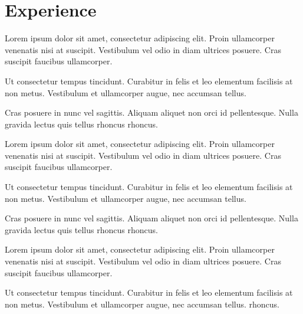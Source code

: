 \documentclass[]{plushcv}
\begin{document}
\begin{minipage}[t]{0.70\textwidth} 



\section{Experience}
\vspace{\topsep} %
\begin{tightemize}
\sectionsep
\item Lorem ipsum dolor sit amet, consectetur adipiscing elit. Proin ullamcorper venenatis nisi at suscipit. Vestibulum vel odio in diam ultrices posuere. Cras suscipit faucibus ullamcorper.
\item Ut consectetur tempus tincidunt. Curabitur in felis et leo elementum facilisis at non metus. Vestibulum et ullamcorper augue, nec accumsan tellus. \item Cras posuere in nunc vel sagittis. Aliquam aliquet non orci id pellentesque. Nulla gravida lectus quis tellus rhoncus rhoncus.  
\end{tightemize}
\sectionsep

\begin{tightemize}
\sectionsep
\item Lorem ipsum dolor sit amet, consectetur adipiscing elit. Proin ullamcorper venenatis nisi at suscipit. Vestibulum vel odio in diam ultrices posuere. Cras suscipit faucibus ullamcorper.
\item Ut consectetur tempus tincidunt. Curabitur in felis et leo elementum facilisis at non metus. Vestibulum et ullamcorper augue, nec accumsan tellus.
\item Cras posuere in nunc vel sagittis. Aliquam aliquet non orci id pellentesque. Nulla gravida lectus quis tellus rhoncus rhoncus.
\end{tightemize}
\sectionsep

\begin{tightemize}
\sectionsep
\item Lorem ipsum dolor sit amet, consectetur adipiscing elit. Proin ullamcorper venenatis nisi at suscipit. Vestibulum vel odio in diam ultrices posuere. Cras suscipit faucibus ullamcorper.
\item Ut consectetur tempus tincidunt. Curabitur in felis et leo elementum facilisis at non metus. Vestibulum et ullamcorper augue, nec accumsan tellus.
 rhoncus.
\end{tightemize}
\sectionsep



\end{minipage}
\end{document}
